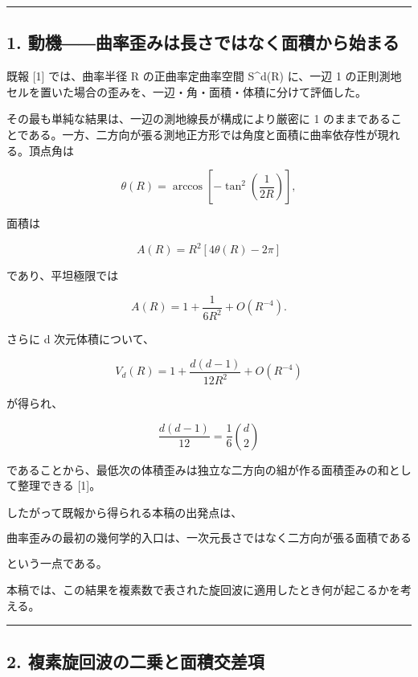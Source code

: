 \documentclass[
  a4paper,
]{ltjsarticle}
\begin{document}
\begin{center}\rule{0.5\linewidth}{0.5pt}\end{center}

\subsection{1.
動機――曲率歪みは長さではなく面積から始まる}\label{ux52d5ux6a5fux66f2ux7387ux6b6aux307fux306fux9577ux3055ux3067ux306fux306aux304fux9762ux7a4dux304bux3089ux59cbux307eux308b}

既報 {[}1{]} では、曲率半径 R の正曲率定曲率空間 S\^{}d(R) に、一辺 1
の正則測地セルを置いた場合の歪みを、一辺・角・面積・体積に分けて評価した。

その最も単純な結果は、一辺の測地線長が構成により厳密に 1
のままであることである。一方、二方向が張る測地正方形では角度と面積に曲率依存性が現れる。頂点角は

\[\theta(R)=\arccos\left[-\tan^2\left(\frac{1}{2R}\right)\right],\]

面積は

\[A(R) = R^2\left[4\theta(R)-2\pi\right]\]

であり、平坦極限では

\[A(R) = 1+\frac{1}{6R^2}+O(R^{-4}).\]

さらに d 次元体積について、

\[V_d(R) = 1+\frac{d(d-1)}{12R^2}+O(R^{-4})\]

が得られ、

\[\frac{d(d-1)}{12} = \frac{1}{6}\binom{d}{2}\]

であることから、最低次の体積歪みは独立な二方向の組が作る面積歪みの和として整理できる
{[}1{]}。

したがって既報から得られる本稿の出発点は、

\[\boxed{\text{曲率歪みの最初の幾何学的入口は、一次元長さではなく二方向が張る面積である}}\]

という一点である。

本稿では、この結果を複素数で表された旋回波に適用したとき何が起こるかを考える。

\begin{center}\rule{0.5\linewidth}{0.5pt}\end{center}

\subsection{2.
複素旋回波の二乗と面積交差項}\label{ux8907ux7d20ux65cbux56deux6ce2ux306eux4e8cux4e57ux3068ux9762ux7a4dux4ea4ux5deeux9805}
\end{document}
